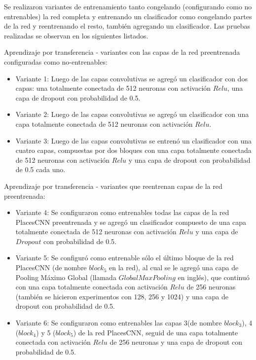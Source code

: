 Se realizaron variantes de entrenamiento tanto congelando (configurando como no entrenables) la red completa y entrenando un clasificador como congelando partes de la red y reentrenando el resto, también agregando un clasificador. Las pruebas realizadas se observan en los siguientes listados. 

Aprendizaje por transferencia - variantes con las capas de la red preentrenada configuradas como no-entrenables:
\begin{itemize}
	\item Variante 1: Luego de las capas convolutivas se agregó un clasificador con dos capas: una totalmente conectada de 512 neuronas con activación \(Relu\), una capa de dropout con probabilidad de 0.5.
	\item Variante 2: Luego de las capas convolutivas se agregó un clasificador con una capa totalmente conectada de 512 neuronas con activación \(Relu\).
	\item Variante 3: Luego de las capas convolutivas se entrenó un clasificador con una cuatro capas, compuestas por dos bloques con una capa totalmente conectada de 512 neuronas con activación \(Relu\) y una capa de dropout con probabilidad de 0.5 cada uno.
\end{itemize}

Aprendizaje por transferencia - variantes que reentrenan capas de la red preentrenada:
\begin{itemize}
	\item Variante 4: Se configuraron como entrenables todas las capas de la red PlacesCNN preentrenada y se agregó un clasificador compuesto de una capa totalmente conectada de 512 neuronas con activación \(Relu\) y una capa de \(Dropout\) con probabilidad de 0.5.
	\item Variante 5: Se configuró como entrenable sólo el último bloque de la red PlacesCNN (de nombre \(block_5\) en la red), al cual se le agregó una capa de Pooling Máximo Global (llamada \(GlobalMaxPooling\) en inglés), que continuó con una capa totalmente conectada con activación \(Relu\) de 256 neuronas (también se hicieron experimentos con 128, 256 y 1024) y una capa de dropout con probabilidad de 0.5.
	\item Variante 6: Se configuraron como entrenables las capas 3(de nombre \(block_3\)), 4 (\(block_4\)) y 5 (\(block_5\)) de la red PlacesCNN, seguid de una capa totalmente conectada con activación \(Relu\) de 256 neuronas y una capa de dropout con probabilidad de 0.5.
\end{itemize}

